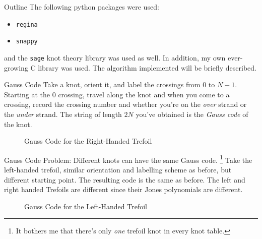 \documentclass{beamer}
\begin{document}
    \begin{frame}{Outline}
        The following python packages were used:
        \begin{itemize}
            \item \texttt{regina}
            \item \texttt{snappy}
        \end{itemize}
        and the \texttt{sage} knot theory library was used as well.
        In addition, my own ever-growing C library was used. The algorithm
        implemented will be briefly described.
    \end{frame}
    \begin{frame}{Gauss Code}
        Take a knot, orient it, and label the crossings from 0 to $N-1$.
        Starting at the 0 crossing, travel along the knot and when you come
        to a crossing, record the crossing number and whether you're on the
        \textit{over} strand or the \textit{under} strand. The string of length
        $2N$ you've obtained is the \textit{Gauss code} of the knot.
        \begin{figure}
            \centering
            \caption{Gauss Code for the Right-Handed Trefoil}
            \label{fig:right_handed_trefoil_gauss_code}
        \end{figure}
    \end{frame}
    \begin{frame}{Gauss Code}
        Problem: Different knots can have the same Gauss code.%
        \footnote{%
            It bothers me that there's only \textit{one} trefoil knot in every
            knot table.
        }
        Take the left-handed trefoil, similar orientation and labelling scheme
        as before, but different starting point. The resulting code is the same
        as before. The left and right handed Trefoils are different since
        their Jones polynomials are different.
        \begin{figure}
            \centering
            \caption{Gauss Code for the Left-Handed Trefoil}
            \label{fig:left_handed_trefoil_gauss_code}
        \end{figure}
    \end{frame}
\end{document}
